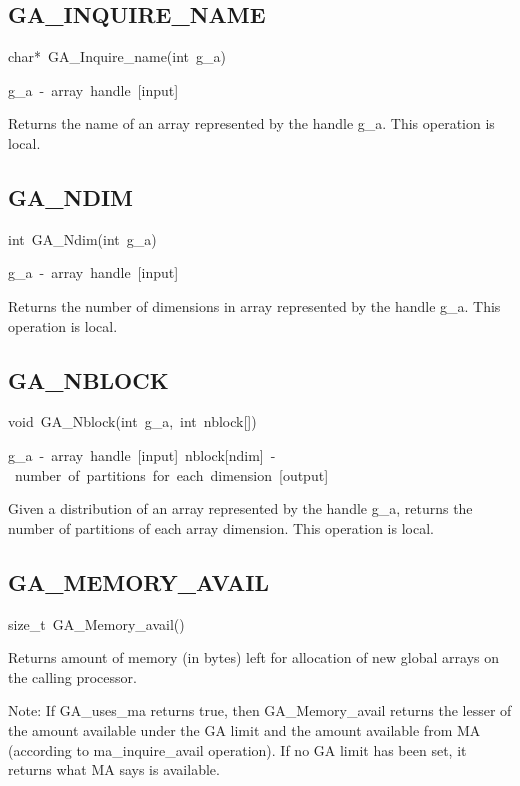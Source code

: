 \subsection*{\label{sub:GA_INQUIRE_NAME}GA\_INQUIRE\_NAME}
\begin{lyxcode}
char{*}~GA\_Inquire\_name(int~g\_a)

g\_a~-~array~handle~{[}input{]}
\end{lyxcode}
Returns the name of an array represented by the handle g\_a. This
operation is local. 


\subsection*{\label{sub:GA_NDIM}GA\_NDIM}
\begin{lyxcode}
int~GA\_Ndim(int~g\_a)

g\_a~-~array~handle~{[}input{]}
\end{lyxcode}
Returns the number of dimensions in array represented by the handle
g\_a. This operation is local. 


\subsection*{\label{sub:GA_NBLOCK}GA\_NBLOCK}
\begin{lyxcode}
void~GA\_Nblock(int~g\_a,~int~nblock{[}{]})

g\_a~-~array~handle~{[}input{]}~nblock{[}ndim{]}~-~number~of~partitions~for~each~dimension~{[}output{]}
\end{lyxcode}
Given a distribution of an array represented by the handle g\_a, returns
the number of partitions of each array dimension. This operation is
local. 


\subsection*{\label{sub:GA_MEMORY_AVAIL}GA\_MEMORY\_AVAIL}
\begin{lyxcode}
size\_t~GA\_Memory\_avail()
\end{lyxcode}
Returns amount of memory (in bytes) left for allocation of new global
arrays on the calling processor.

Note: If GA\_uses\_ma returns true, then GA\_Memory\_avail returns
the lesser of the amount available under the GA limit and the amount
available from MA (according to ma\_inquire\_avail operation). If
no GA limit has been set, it returns what MA says is available.

